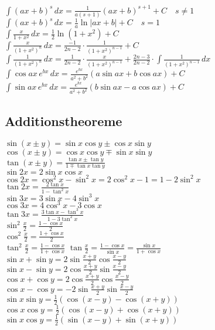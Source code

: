 \documentclass[landscape, 10pt]{article}
\begin{document}
\begin{multicols}{3}
$\int(ax+b)^s\,dx=\frac{1}{a(s+1)}(ax+b)^{s+1}+C\quad s\neq1$\\
$\int(ax+b)^s\,dx=\frac{1}{a}\ln|ax+b|+C\quad s=1$\\
$\int\frac{x}{1+x^2}\,dx=\frac{1}{2}\ln(1+x^2)+C$\\
$\int\frac{x}{(1+x^2)^n}\,dx=\frac{-1}{2n-2}\cdot
       \frac{1}{(1+x^2)^{n-1}}+C$\\
$\int\frac{1}{(1+x^2)^n}\,dx=\frac{1}{2n-2}\cdot
       \frac{x}{(1+x^2)^{n-1}}+\frac{2n-3}{2n-2}\cdot
       \int\frac{1}{(1+x^2)^{n-1}}\,dx$\\
$\int \cos ax\, e^{bx}\, dx 
       = \frac{e^{bx}}{a^2+b^2}
       \left( a\sin ax + b\cos ax \right) + C$\\
$\int \sin ax\, e^{bx}\, dx 
       = \frac{e^{bx}}{a^2+b^2}
       \left( b\sin ax - a\cos ax \right) + C$\\


\subsection{Additionstheoreme}
$\sin(x\pm y)=\sin x\cos y\pm\cos x\sin y$\\
$\cos(x\pm y)=\cos x\cos y\mp\sin x\sin y$\\
$\tan(x\pm y)=\frac{\tan x\pm\tan y}{1\mp\tan x\tan y}$\\
$\sin 2x=2\sin x\cos x$\\
$\cos 2x=\cos^2x-\sin^2x=2\cos^2x-1=1-2\sin^2x$\\
$\tan 2x=\frac{2\tan x}{1-\tan^2x}$\\
$\sin 3x=3\sin x-4\sin^3x$\\
$\cos 3x=4\cos^3x-3\cos x$\\
$\tan 3x=\frac{3\tan x-\tan^3x}{1-3\tan^2 x}$\\
$\sin^2\frac{x}{2}=\frac{1-\cos x}{2}$\\
$\cos^2\frac{x}{2}=\frac{1+\cos x}{2}$\\
$\tan^2\frac{x}{2}=\frac{1-\cos x}{1+\cos x}$
$\tan\frac{x}{2}=\frac{1-\cos x}{\sin x}=\frac{\sin x}{1+\cos x}$\\
$\sin x+\sin y=2\sin\frac{x+y}{2}\cos\frac{x-y}{2}$\\
$\sin x-\sin y=2\cos\frac{x+y}{2}\sin\frac{x-y}{2}$\\
$\cos x+\cos y=2\cos\frac{x+y}{2}\cos\frac{x-y}{2}$\\
$\cos x-\cos y=-2\sin\frac{x+y}{2}\sin\frac{x-y}{2}$\\
$\sin x\sin y=\frac{1}{2}(\cos(x-y)-\cos(x+y))$\\
$\cos x\cos y=\frac{1}{2}(\cos(x-y)+\cos(x+y))$\\
$\sin x\cos y=\frac{1}{2}(\sin(x-y)+\sin(x+y))$


\end{multicols}
\end{document}
